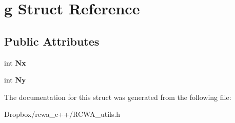 \hypertarget{structg}{}\section{g Struct Reference}
\label{structg}
\subsection*{Public Attributes}
\begin{DoxyCompactItemize}
\item 
int {\bfseries Nx}\hypertarget{structg_aedafab9a1886a19e7640b65ca895c703}{}\label{structg_aedafab9a1886a19e7640b65ca895c703}

\item 
int {\bfseries Ny}\hypertarget{structg_a8c204662b1e5ace41e99ef82606bcd2e}{}\label{structg_a8c204662b1e5ace41e99ef82606bcd2e}

\end{DoxyCompactItemize}


The documentation for this struct was generated from the following file\+:\begin{DoxyCompactItemize}
\item 
Dropbox/rcwa\+\_\+c++/R\+C\+W\+A\+\_\+utils.\+h\end{DoxyCompactItemize}
